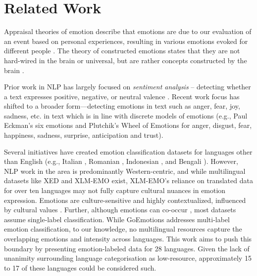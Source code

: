 \section{Related Work}
Appraisal theories of emotion describe that emotions are due to our evaluation of an event based on personal experiences, resulting in various emotions evoked for different people \citep{arnold1960emotion, moors2013appraisal,ellsworth2013appraisal,frijda1986emotions,lazarus1991emotion,ortony2022cognitive,roseman2013appraisal,scherer2009dynamic}. The theory of constructed emotions states that they are not hard-wired in the brain or universal, but are rather concepts constructed by the brain \citep{barrett2016,barrett2017emotions}. 

Prior work in NLP has largely focused on \textit{sentiment analysis} -- detecting whether a text expresses positive, negative, or neutral valence \citep{Mohammad2016,muhammad-etal-2023-semeval}. Recent work focus has shifted to a broader form—detecting emotions in text such as anger, fear, joy, sadness, etc. in text which is in line with discrete models of emotions (e.g., Paul Eckman's six emotions \citep{ekman1992there} and Plutchik's Wheel of Emotions \citep{Plutchik1980} for anger, disgust, fear, happiness, sadness, surprise, anticipation and trust).

Several initiatives have created emotion classification datasets for languages other than English (e.g., Italian \citep{bianchi-etal-2021-feel}, Romanian \citep{ciobotaru-etal-2022-red},
Indonesian \citep{saputri2018emotion}, and Bengali \citep{iqbal2022bemoc}). However, NLP work in the area is predominantly Western-centric, and while multilingual datasets like XED \citep{ohman2020xed} and XLM-EMO \citep{bianchi2022xlm} exist, XLM-EMO's reliance on translated data for over ten languages may not fully capture cultural nuances in emotion expression. Emotions are culture-sensitive and highly contextualized, influenced by cultural values \citep{havaldar-etal-2023-multilingual,mohamed-etal-2024-culture,hershcovich-etal-2022-challenges}. Further, although emotions can co-occur \citep{vishnubhotla-etal-2024-emotion-granularity}, most datasets assume single-label classification. While GoEmotions \citep{demszky-etal-2020-goemotions} addresses multi-label emotion classification, to our knowledge, no multilingual resources capture the overlapping emotions and intensity across languages.
This work aims to push this boundary by presenting emotion-labeled data for 28 languages. Given the lack of unanimity surrounding language categorisation as low-resource, approximately 15 to 17 of these languages could be considered such. 


